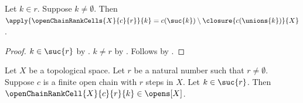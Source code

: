 \begin{corollary}\label{open_chain_rank_cells_interior}
    Let $k\in r$.
    Suppose $k\neq\emptyset$.
    Then $\apply{\openChainRankCells{X}{c}{r}}{k}
        =c(\suc{k})\setminus\closure{c(\unions{k})}{X}$.
\end{corollary}
\begin{proof}
    $k\in\suc{r}$ by .
    $k\neq r$ by .
    Follows by
        .
\end{proof}

\begin{proposition}\label{open_chain_rank_cell_open}
    Let $X$ be a topological space.
    Let $r$ be a natural number such that $r\neq\emptyset$.
    Suppose $c$ is a finite open chain with $r$ steps in $X$.
    Let $k\in\suc{r}$.
    Then
        $\openChainRankCell{X}{c}{r}{k}
            \in\opens[X]$.
\end{proposition}
